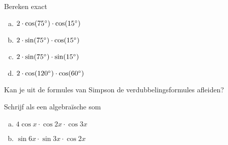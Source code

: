 \documentclass[a4paper,12pt]{article}
\begin{document}
\begin{oefening}
Bereken exact
\begin{enumerate}[(a)]
\itemsep.5em
  \item $2\cdot \cos(75^\circ)\cdot \cos(15^\circ)$
  \item $2\cdot \sin(75^\circ)\cdot \cos(15^\circ)$
  \item $2\cdot \sin(75^\circ)\cdot \sin(15^\circ)$
  \item $2\cdot \cos(120^\circ)\cdot \cos(60^\circ)$
\end{enumerate}
\end{oefening}

\begin{oefening}
Kan je uit de formules van Simpson de verdubbelingsformules afleiden?
\end{oefening}

\begin{oefening}
Schrijf als een algebraïsche som
\begin{enumerate}[(a)]
\itemsep.5em
  \item $4 \cos x \cdot \cos 2x \cdot \cos 3x$
  \item $\sin 6x \cdot \sin 3x \cdot \cos 2x$
\end{enumerate}
\end{oefening}
\end{document}
